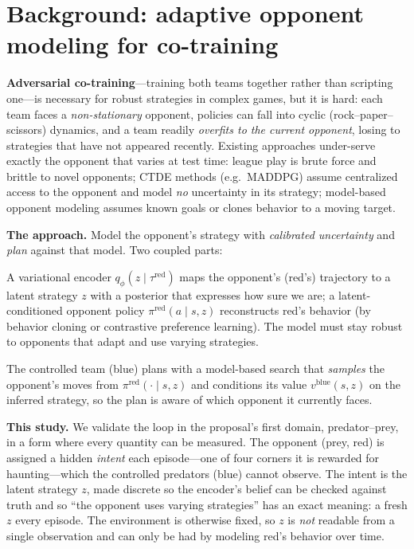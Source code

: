 \documentclass[11pt]{article}
\newcommand{\red}[1]{\textcolor{red1}{#1}}
\newcommand{\blue}[1]{\textcolor{blue1}{#1}}
\newcommand{\tred}{\tau^{\mathrm{red}}}
\newcommand{\zlat}{z}
\begin{document}
\section{Background: adaptive opponent modeling for co-training}

\textbf{Adversarial co-training}---training both teams together rather than
scripting one---is necessary for robust strategies in complex games, but it is
hard: each team faces a \emph{non-stationary} opponent, policies can fall into
cyclic (rock--paper--scissors) dynamics, and a team readily \emph{overfits to the
current opponent}, losing to strategies that have not appeared recently. Existing
approaches under-serve exactly the opponent that varies at test time: league play
is brute force and brittle to novel opponents; CTDE methods (e.g.\ MADDPG) assume
centralized access to the opponent and model \emph{no} uncertainty in its
strategy; model-based opponent modeling assumes known goals or clones behavior to
a moving target.

\textbf{The approach.} Model the opponent's strategy with \emph{calibrated
uncertainty} and \emph{plan} against that model. Two coupled parts:
\begin{description}[style=nextline,font=\normalfont\bfseries,leftmargin=1.2em]
\item[Part 1 (uncertainty-aware opponent model).] A variational encoder
$q_\phi(\zlat \mid \tred)$ maps the opponent's (\red{red}'s) trajectory to a
latent strategy $\zlat$ with a posterior that expresses how sure we are; a
latent-conditioned opponent policy $\pi^{\mathrm{red}}(a \mid s, \zlat)$
reconstructs \red{red}'s behavior (by behavior cloning or contrastive preference
learning). The model must stay robust to opponents that adapt and use varying
strategies.
\item[Part 2 (plan against it).] The controlled team (\blue{blue}) plans with a
model-based search that \emph{samples} the opponent's moves from
$\pi^{\mathrm{red}}(\cdot \mid s, \zlat)$ and conditions its value
$v^{\mathrm{blue}}(s, \zlat)$ on the inferred strategy, so the plan is aware of
which opponent it currently faces.
\end{description}

\textbf{This study.} We validate the loop in the proposal's first domain,
predator--prey, in a form where every quantity can be measured. The opponent
(prey, \red{red}) is assigned a hidden \emph{intent} each episode---one of four
corners it is rewarded for haunting---which the controlled predators (\blue{blue})
cannot observe. The intent is the latent strategy $\zlat$, made discrete so the
encoder's belief can be checked against truth and so ``the opponent uses varying
strategies'' has an exact meaning: a fresh $\zlat$ every episode. The environment
is otherwise fixed, so $\zlat$ is \emph{not} readable from a single observation
and can only be had by modeling \red{red}'s behavior over time.
\end{document}
